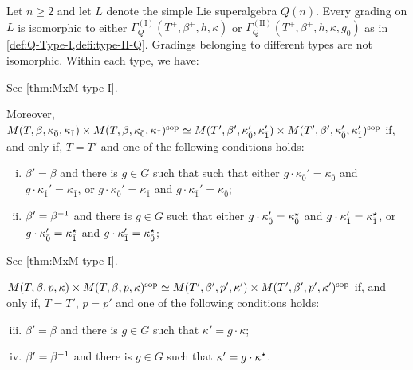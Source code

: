 \begin{thm}
    Let $n \geq 2$ and 
    let $L$ denote the simple Lie superalgebra $Q(n)$. 
    Every grading on $L$ is isomorphic to either $\Gamma_Q^{\mathrm{(I)}}(T^+, \beta^+, h, \kappa)$ or $\Gamma_Q^{\mathrm{(II)}}(T^+, \beta^+, h, \kappa, g_0)$ as in \cref{def:Q-Type-I,defi:type-II-Q}. 
    Gradings belonging to different types are not isomorphic. 
    Within each type, we have:
    
    
        See \cref{thm:MxM-type-I}.
        
        Moreover, $M(T, \beta, \kappa_{\bar{0}}, \kappa_{\bar{1}}) \times M(T, \beta, \kappa_{\bar{0}}, \kappa_{\bar{1}})^{\mathrm{sop}} \simeq M(T', \beta', \kappa_{\bar{0}}', \kappa_{\bar{1}}') \times M(T', \beta', \kappa_{\bar{0}}', \kappa_{\bar{1}}')^{\mathrm{sop}}$ if, and only if, $T = T'$ and one of the following conditions holds:
	\begin{enumerate}[(i)]
	    \item $\beta'=\beta$ and there is $g\in G$ such that such that either $g \cdot \kappa_{\bar 0}'=\kappa_{\bar 0}$ and $g \cdot \kappa_{\bar 1}'=\kappa_{\bar 1}$, or $g \cdot \kappa_{\bar 0}'=\kappa_{\bar 1}$ and $g \cdot \kappa_{\bar 1}'=\kappa_{\bar 0}$; 
	    \item $\beta'=\beta^{-1}$ and there is $g\in G$ such that either $g \cdot \kappa_{\bar 0}'=\kappa_{\bar 0}^\star$ and $g \cdot \kappa_{\bar 1}'=\kappa_{\bar 1}^\star$, or $g \cdot \kappa_{\bar 0}'=\kappa_{\bar 1}^\star$ and $g \cdot \kappa_{\bar 1}'=\kappa_{\bar 0}^\star$;
	\end{enumerate}
        
    
        See \cref{thm:MxM-type-I}.
    
        $M (T, \beta, p, \kappa) \times M (T, \beta, p, \kappa)^{\mathrm{sop}} \simeq M (T', \beta', p', \kappa') \times M (T', \beta', p', \kappa')^{\mathrm{sop}}$ if, and only if, $T = T'$, $p=p'$ and one of the following conditions holds:
    \begin{enumerate}[(i)]
        \setcounter{enumi}{2}
	    \item $\beta'=\beta$ and there is $g\in G$ such that $\kappa' = g \cdot \kappa$;
	    \item $\beta'=\beta^{-1}$ and there is $g\in G$ such that $\kappa' = g \cdot \kappa^\star$. 
	\end{enumerate}
        
    

\end{thm}
